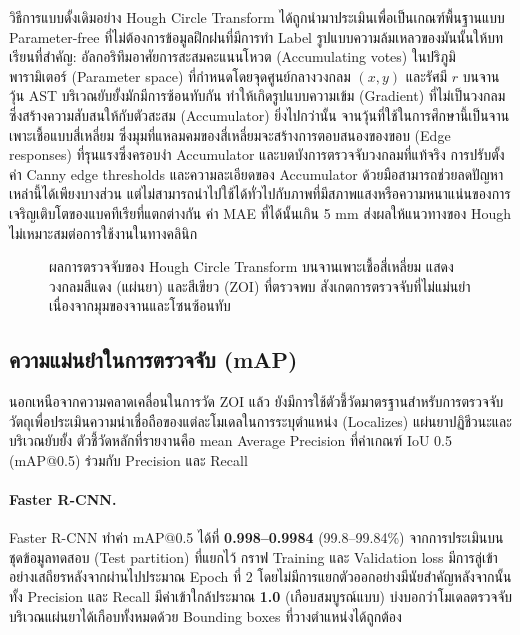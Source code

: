 วิธีการแบบดั้งเดิมอย่าง Hough Circle Transform ได้ถูกนำมาประเมินเพื่อเป็นเกณฑ์พื้นฐานแบบ Parameter-free ที่ไม่ต้องการข้อมูลฝึกฝนที่มีการทำ Label
รูปแบบความล้มเหลวของมันนั้นให้บทเรียนที่สำคัญ: อัลกอริทึมอาศัยการสะสมคะแนนโหวต (Accumulating votes) ในปริภูมิพารามิเตอร์ (Parameter space) ที่กำหนดโดยจุดศูนย์กลางวงกลม $(x, y)$ และรัศมี $r$
บนจานวุ้น AST บริเวณยับยั้งมักมีการซ้อนทับกัน ทำให้เกิดรูปแบบความเข้ม (Gradient) ที่ไม่เป็นวงกลม ซึ่งสร้างความสับสนให้กับตัวสะสม (Accumulator)
ยิ่งไปกว่านั้น จานวุ้นที่ใช้ในการศึกษานี้เป็นจานเพาะเชื้อแบบสี่เหลี่ยม ซึ่งมุมที่แหลมคมของสี่เหลี่ยมจะสร้างการตอบสนองของขอบ (Edge responses) ที่รุนแรงซึ่งครอบงำ Accumulator และบดบังการตรวจจับวงกลมที่แท้จริง
การปรับตั้งค่า Canny edge thresholds และความละเอียดของ Accumulator ด้วยมือสามารถช่วยลดปัญหาเหล่านี้ได้เพียงบางส่วน แต่ไม่สามารถนำไปใช้ได้ทั่วไปกับภาพที่มีสภาพแสงหรือความหนาแน่นของการเจริญเติบโตของแบคทีเรียที่แตกต่างกัน
ค่า MAE ที่ได้นั้นเกิน 5 mm ส่งผลให้แนวทางของ Hough ไม่เหมาะสมต่อการใช้งานในทางคลินิก

\begin{figure}[H]
  \centering
  \caption{ผลการตรวจจับของ Hough Circle Transform บนจานเพาะเชื้อสี่เหลี่ยม แสดงวงกลมสีแดง (แผ่นยา)
    และสีเขียว (ZOI) ที่ตรวจพบ สังเกตการตรวจจับที่ไม่แม่นยำเนื่องจากมุมของจานและโซนซ้อนทับ}
  \label{fig:hough_square}
\end{figure}

\subsection{ความแม่นยำในการตรวจจับ (mAP)}
\label{subsec:map_accuracy}

นอกเหนือจากความคลาดเคลื่อนในการวัด ZOI แล้ว ยังมีการใช้ตัวชี้วัดมาตรฐานสำหรับการตรวจจับวัตถุเพื่อประเมินความน่าเชื่อถือของแต่ละโมเดลในการระบุตำแหน่ง (Localizes) แผ่นยาปฏิชีวนะและบริเวณยับยั้ง
ตัวชี้วัดหลักที่รายงานคือ mean Average Precision ที่ค่าเกณฑ์ IoU 0.5 (mAP@0.5) ร่วมกับ Precision และ Recall

\paragraph{Faster R-CNN.}
Faster R-CNN ทำค่า mAP@0.5 ได้ที่ \textbf{0.998--0.9984} (99.8--99.84\%)
จากการประเมินบนชุดข้อมูลทดสอบ (Test partition) ที่แยกไว้
กราฟ Training และ Validation loss มีการลู่เข้าอย่างเสถียรหลังจากผ่านไปประมาณ Epoch ที่ 2 โดยไม่มีการแยกตัวออกอย่างมีนัยสำคัญหลังจากนั้น
ทั้ง Precision และ Recall มีค่าเข้าใกล้ประมาณ \textbf{1.0} (เกือบสมบูรณ์แบบ) บ่งบอกว่าโมเดลตรวจจับบริเวณแผ่นยาได้เกือบทั้งหมดด้วย Bounding boxes ที่วางตำแหน่งได้ถูกต้อง

